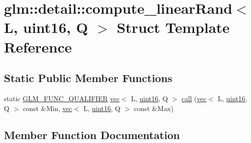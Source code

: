 \hypertarget{structglm_1_1detail_1_1compute__linear_rand_3_01_l_00_01uint16_00_01_q_01_4}{}\section{glm\+:\+:detail\+:\+:compute\+\_\+linear\+Rand$<$ L, uint16, Q $>$ Struct Template Reference}
\label{structglm_1_1detail_1_1compute__linear_rand_3_01_l_00_01uint16_00_01_q_01_4}
\subsection*{Static Public Member Functions}
\begin{DoxyCompactItemize}
\item 
static \hyperlink{setup_8hpp_a33fdea6f91c5f834105f7415e2a64407}{G\+L\+M\+\_\+\+F\+U\+N\+C\+\_\+\+Q\+U\+A\+L\+I\+F\+I\+ER} \hyperlink{structglm_1_1vec}{vec}$<$ L, \hyperlink{namespaceglm_1_1detail_a47b2a7d006d187338e8031a352d1ce56}{uint16}, Q $>$ \hyperlink{structglm_1_1detail_1_1compute__linear_rand_3_01_l_00_01uint16_00_01_q_01_4_a26cd13e82c8f2dc14b2efd0a0f46c459}{call} (\hyperlink{structglm_1_1vec}{vec}$<$ L, \hyperlink{namespaceglm_1_1detail_a47b2a7d006d187338e8031a352d1ce56}{uint16}, Q $>$ const \&Min, \hyperlink{structglm_1_1vec}{vec}$<$ L, \hyperlink{namespaceglm_1_1detail_a47b2a7d006d187338e8031a352d1ce56}{uint16}, Q $>$ const \&Max)
\end{DoxyCompactItemize}


\subsection{Member Function Documentation}
\mbox{\label{structglm_1_1detail_1_1compute__linear_rand_3_01_l_00_01uint16_00_01_q_01_4_a26cd13e82c8f2dc14b2efd0a0f46c459}} 
